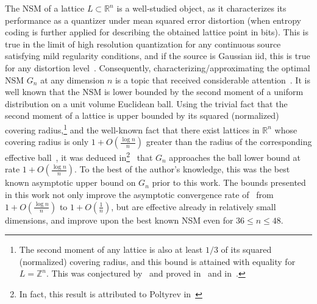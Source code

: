 \documentclass[article,doublecolumn]{IEEEtran}
\newcommand{\R}{{\mathbb{R}}}
\newcommand{\Z}{{\mathbb{Z}}}
\begin{document}
The NSM of a lattice $L\subset\R^n$ is a well-studied object, as it characterizes its performance as a quantizer under mean squared error distortion (when entropy coding is further applied for describing the obtained lattice point in bits). This is true in the limit of high resolution quantization for any continuous source satisfying mild regularity conditions, and if the source is Gaussian iid, this is true for any distortion level~\cite{ramibook}. Consequently, characterizing/approximating the optimal NSM $G_n$ at any dimension $n$ is a topic that received considerable attention~\cite{fejes1959representation,cs82vor,barnes1983optimal,conway1984voronoi,conway1985lower,ConwaySloane,ZamirFeder2002,agrell1998optimization,lyu2022better,agrell2023best,ling2024rejection,agrell2024glued,pook2024parametric,agrell2025optimization}. It is well known that the NSM is lower bounded by the second moment of a uniform distribution on a unit volume Euclidean ball. Using the trivial fact that the second moment of a lattice is upper bounded by its squared (normalized) covering radius,\footnote{The second moment of any lattice is also at least $1/3$ of its squared (normalized) covering radius, and this bound is attained with equality for $L=\Z^n$. This was conjectured by~\cite{haviv2009note} and proved in~\cite[Lemme 3.2]{autissier2013lemme} and in~\cite{magazinov2020proof}.} and the well-known fact that there exist lattices in $\R^n$ whose covering radius is only $1+O(\frac{\log n}{n})$ greater than the radius of the corresponding effective ball~\cite{Rogers_again}, it was deduced in\footnote{In fact, this result is attributed to Poltyrev in~\cite{ZamirFeder2002}}~\cite{ZamirFeder2002} that $G_n$ approaches the ball lower bound at rate $1+O(\frac{\log n}{n})$. To the best of the author's knowledge, this was the best known asymptotic upper bound on $G_n$ prior to this work. The bounds presented in this work not only improve the asymptotic convergence rate of~\cite{ZamirFeder2002} from $1+O(\frac{\log n}{n})$ to $1+O(\frac{1}{n})$, but are effective already in relatively small dimensions, and improve upon the best known NSM even for $36\leq n\leq 48$.  
\end{document}
